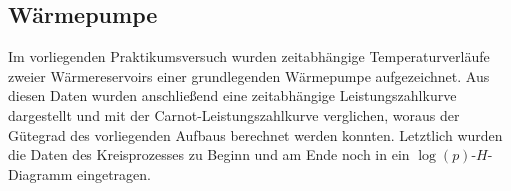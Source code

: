 \documentclass[english, ngerman]{scrartcl}
\begin{document}
\subsection{Wärmepumpe}
\label{subsec:zusammenfassung_waermepumpe}

Im vorliegenden Praktikumsversuch wurden zeitabhängige Temperaturverläufe zweier Wärmereservoirs einer grundlegenden Wärmepumpe aufgezeichnet. Aus diesen Daten wurden anschließend eine zeitabhängige Leistungszahlkurve dargestellt und mit der Carnot-Leistungszahlkurve verglichen, woraus der Gütegrad des vorliegenden Aufbaus berechnet werden konnten. Letztlich wurden die Daten des Kreisprozesses zu Beginn und am Ende noch in ein $\log(p)$-$H$-Diagramm eingetragen.



\clearpage
\printbibliography

\listoffigures

\listoftables
\end{document}
